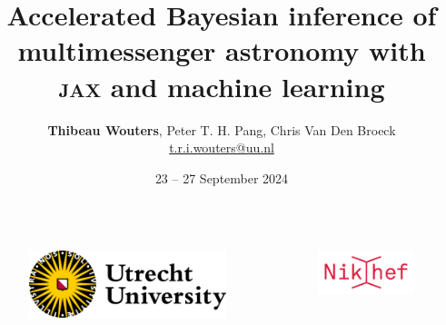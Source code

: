 \documentclass[usenames,dvipsnames,t]{beamer}
\title[XMXS] %
{Accelerated Bayesian inference of multimessenger astronomy with \textsc{jax} and machine learning}
\author[Thibeau Wouters]{\small{\textbf{Thibeau Wouters}, Peter T. H. Pang, Chris Van Den Broeck} \\ \vspace{2mm} \href{mailto:t.r.i.wouters@uu.nl}{t.r.i.wouters@uu.nl} \newline \github \quad \linkedin \quad \twitter} %
\date{23 -- 27 September 2024}
\begin{document}
{

  
\begin{frame}
\titlepage

\begin{columns}
  \begin{figure}
    \centering
    \vspace{1.5mm}
    \includegraphics[width=0.75\linewidth]{Figures/utrecht-university.png}
  \end{figure}
  \begin{figure}
    \centering
    \includegraphics[width=0.75\linewidth]{Figures/Nikhef_logo-transparent.png}
  \end{figure}
\end{columns}

\end{frame}
}
\end{document}

